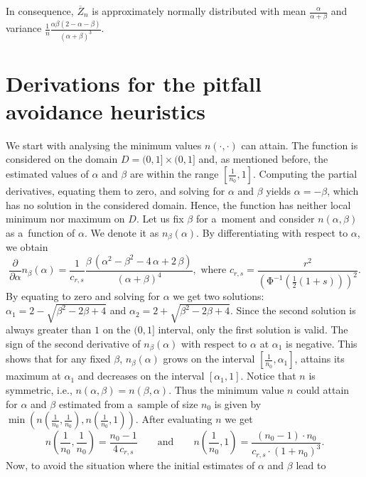\documentclass[runningheads,a4paper]{llncs}
\begin{document}
In consequence, $\overline{Z}_n$ is approximately normally distributed with mean
$\frac{\alpha}{\alpha+\beta}$ and variance
$\frac{1}{n}\frac{\alpha\beta(2-\alpha-\beta)}{(\alpha+\beta)^3}$.

\section{Derivations for the pitfall avoidance heuristics}
\label{app:1st_approach}

We start with analysing the minimum values $n(\cdot,\cdot)$ can attain. The function is considered
on the domain $D=(0,1]\times(0,1]$ and, as mentioned before, the estimated values of $\alpha$ and
$\beta$ are within the range $[\frac{1}{n_0},1]$. Computing the partial derivatives, equating them
to zero, and solving for $\alpha$ and $\beta$ yields $\alpha = -\beta$, which has no solution in
the considered domain. Hence, the function has neither local minimum nor maximum on $D$. Let us
fix $\beta$ for a~moment and consider $n(\alpha,\beta)$ as a~function of $\alpha$.
We denote it as $n_{\beta}(\alpha)$.
By differentiating with respect to $\alpha$, we obtain
\[
\frac{\partial}{\partial \alpha}n_{\beta}\left(\alpha\right) =
\frac{1}{c_{r,s}}\frac {\beta\, \left( {\alpha}^{2}-{\beta}^{2}-4\,\alpha+2\,\beta
 \right) }{ \left( \alpha+\beta \right) ^{4}}, \mbox{~where~}
c_{r,s} = \frac{r^2}{\left(\mathrm{\Phi}^{-1}\left(\frac{1}{2}(1+s)\right)\right)^2}.
\]
By equating to zero and solving for $\alpha$ we get two solutions:
$\alpha_1 = 2-\sqrt{\beta^2-2\beta+4}$ and
$\alpha_2 = 2+\sqrt{\beta^2-2\beta+4}$.
Since the second solution is always greater than $1$ on the $(0,1]$ interval, only the first
solution is valid. The sign of the second derivative of $n_{\beta}(\alpha)$ with respect to $\alpha$
at $\alpha_1$ is negative. This shows that for any fixed $\beta$, $n_{\beta}(\alpha)$ grows on the
interval $[\frac{1}{n_0},\alpha_1]$, attains its maximum at $\alpha_1$ and decreases on the
interval $[\alpha_1,1]$. Notice that $n$ is symmetric, i.e., $n(\alpha,\beta) = n(\beta,\alpha)$.
Thus the minimum value $n$ could attain for $\alpha$ and $\beta$ estimated from
a~sample of size $n_0$ is given by
$\min\left(n\left(\frac{1}{n_0},\frac{1}{n_0}\right),n\left(\frac{1}{n_0},1\right)\right)$.
After evaluating $n$ we get
\[
n\left(\frac{1}{n_0},\frac{1}{n_0}\right) = \frac{n_0-1}{4\,c_{r,s}}
\qquad\textrm{and}\qquad
n\left(\frac{1}{n_0},1\right) = \frac{(n_0-1)\cdot n_0}{c_{r,s}\cdot(1+n_0)^3}.
\]
Now, to avoid the situation where the initial estimates of $\alpha$ and $\beta$ lead to
\end{document}
